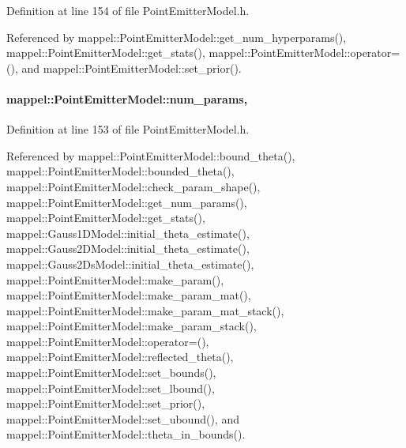 Definition at line 154 of file Point\+Emitter\+Model.\+h.



Referenced by mappel\+::\+Point\+Emitter\+Model\+::get\+\_\+num\+\_\+hyperparams(), mappel\+::\+Point\+Emitter\+Model\+::get\+\_\+stats(), mappel\+::\+Point\+Emitter\+Model\+::operator=(), and mappel\+::\+Point\+Emitter\+Model\+::set\+\_\+prior().

\paragraph[{\texorpdfstring{num\+\_\+params}{num_params}}]{ mappel\+::\+Point\+Emitter\+Model\+::num\+\_\+params\hspace{0.3cm}{\ttfamily [protected]}, {\ttfamily [inherited]}}\hypertarget{classmappel_1_1PointEmitterModel_a9af0484391bd6021ddc04ac666ab49ad}{}\label{classmappel_1_1PointEmitterModel_a9af0484391bd6021ddc04ac666ab49ad}


Definition at line 153 of file Point\+Emitter\+Model.\+h.



Referenced by mappel\+::\+Point\+Emitter\+Model\+::bound\+\_\+theta(), mappel\+::\+Point\+Emitter\+Model\+::bounded\+\_\+theta(), mappel\+::\+Point\+Emitter\+Model\+::check\+\_\+param\+\_\+shape(), mappel\+::\+Point\+Emitter\+Model\+::get\+\_\+num\+\_\+params(), mappel\+::\+Point\+Emitter\+Model\+::get\+\_\+stats(), mappel\+::\+Gauss1\+D\+Model\+::initial\+\_\+theta\+\_\+estimate(), mappel\+::\+Gauss2\+D\+Model\+::initial\+\_\+theta\+\_\+estimate(), mappel\+::\+Gauss2\+Ds\+Model\+::initial\+\_\+theta\+\_\+estimate(), mappel\+::\+Point\+Emitter\+Model\+::make\+\_\+param(), mappel\+::\+Point\+Emitter\+Model\+::make\+\_\+param\+\_\+mat(), mappel\+::\+Point\+Emitter\+Model\+::make\+\_\+param\+\_\+mat\+\_\+stack(), mappel\+::\+Point\+Emitter\+Model\+::make\+\_\+param\+\_\+stack(), mappel\+::\+Point\+Emitter\+Model\+::operator=(), mappel\+::\+Point\+Emitter\+Model\+::reflected\+\_\+theta(), mappel\+::\+Point\+Emitter\+Model\+::set\+\_\+bounds(), mappel\+::\+Point\+Emitter\+Model\+::set\+\_\+lbound(), mappel\+::\+Point\+Emitter\+Model\+::set\+\_\+prior(), mappel\+::\+Point\+Emitter\+Model\+::set\+\_\+ubound(), and mappel\+::\+Point\+Emitter\+Model\+::theta\+\_\+in\+\_\+bounds().

